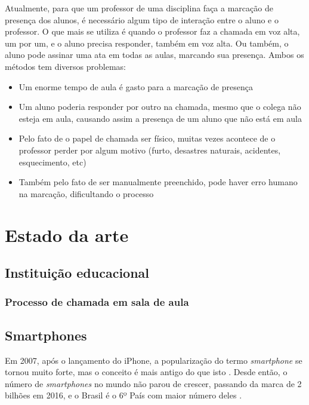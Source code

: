 \documentclass[
	12pt,
	oneside,
	a4paper,
	english,
	brazil,
]{abntex2}
\begin{document}
Atualmente, para que um professor de uma disciplina faça a marcação de presença dos alunos, é necessário algum tipo de interação entre o aluno e o professor. O que mais se utiliza é quando o professor faz a chamada em voz alta, um por um, e o aluno precisa responder, também em voz alta. Ou também, o aluno pode assinar uma ata em todas as aulas, marcando sua presença. Ambos os métodos tem diversos problemas:

\begin{itemize}
    \item Um enorme tempo de aula é gasto para a marcação de presença
    \item Um aluno poderia responder por outro na chamada, mesmo que o colega não esteja em aula, causando assim a presença de um aluno que não está em aula
    \item Pelo fato de o papel de chamada ser físico, muitas vezes acontece de o professor perder por algum motivo (furto, desastres naturais, acidentes, esquecimento, etc)
    \item Também pelo fato de ser manualmente preenchido, pode haver erro humano na marcação, dificultando o processo
\end{itemize}



\chapter{Estado da arte}

\section{Instituição educacional}

\subsection{Processo de chamada em sala de aula}

\section{Smartphones}

Em 2007, após o lançamento do iPhone, a popularização do termo \emph{smartphone} se tornou muito forte, mas o conceito é mais antigo do que isto \cite{smartphone-history-pictures}. Desde então, o número de \emph{smartphones} no mundo não parou de crescer, passando da marca de 2 bilhões em 2016, e o Brasil é o 6º País com maior número deles \cite{smartphone-numbers}.
\end{document}
